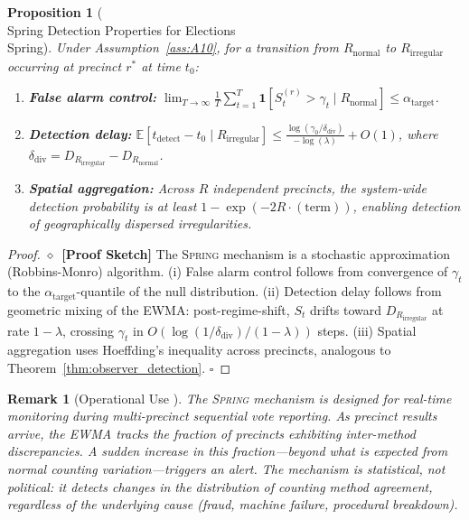 \documentclass[11pt,a4paper]{article}
\newtheorem{proposition}[theorem]{Proposition}
\newtheorem{remark}[theorem]{Remark}
\theoremstyle{definition}
\newcommand{\rigorSketch}[0]{$\diamond$~\textbf{[Proof Sketch]}}
\newcommand{\Spring}{\textsc{Spring}}
\newcommand{\E}{\mathbb{E}}
\newcommand{\ind}[1]{\mathbf{1}[#1]}
\begin{document}
\begin{proposition}[\\Spring{} Detection Properties for Elections \\Spring{}]
\label{prop:spring_electoral}
Under Assumption~\ref{ass:A10}, for a transition from $R_{\text{normal}}$ to $R_{\text{irregular}}$ occurring at precinct $r^*$ at time $t_0$:
\begin{enumerate}[label=(\roman*)]
    \item \textbf{False alarm control:} $\lim_{T \to \infty} \frac{1}{T}\sum_{t=1}^{T} \ind{S_t^{(r)} > \gamma_t \mid R_{\text{normal}}} \leq \alpha_{\text{target}}$.
    \item \textbf{Detection delay:} $\E[t_{\text{detect}} - t_0 \mid R_{\text{irregular}}] \leq \frac{\log(\gamma_0 / \delta_{\text{div}})}{-\log(\lambda)} + O(1)$, where $\delta_{\text{div}} = D_{R_{\text{irregular}}} - D_{R_{\text{normal}}}$.
    \item \textbf{Spatial aggregation:} Across $R$ independent precincts, the system-wide detection probability is at least $1 - \exp(-2R \cdot (\text{term}))$, enabling detection of geographically dispersed irregularities.
\end{enumerate}
\end{proposition}
\begin{proof}\rigorSketch
The \Spring{} mechanism is a stochastic approximation (Robbins-Monro) algorithm. (i) False alarm control follows from convergence of $\gamma_t$ to the $\alpha_{\text{target}}$-quantile of the null distribution. (ii) Detection delay follows from geometric mixing of the EWMA: post-regime-shift, $S_t$ drifts toward $D_{R_{\text{irregular}}}$ at rate $1 - \lambda$, crossing $\gamma_t$ in $O(\log(1/\delta_{\text{div}}) / (1-\lambda))$ steps. (iii) Spatial aggregation uses Hoeffding's inequality across precincts, analogous to Theorem~\ref{thm:observer_detection}. \hfill $\square$
\end{proof}
\begin{remark}[Operational Use ]
\label{rem:spring_ops}
The \Spring{} mechanism is designed for real-time monitoring during multi-precinct sequential vote reporting. As precinct results arrive, the EWMA tracks the fraction of precincts exhibiting inter-method discrepancies. A sudden increase in this fraction---beyond what is expected from normal counting variation---triggers an alert. The mechanism is \textit{statistical}, not political: it detects changes in the distribution of counting method agreement, regardless of the underlying cause (fraud, machine failure, procedural breakdown).
\end{remark}
\end{document}
